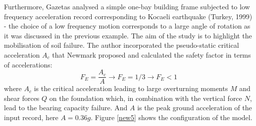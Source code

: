 \documentclass[12pt,a4paper]{report}
\begin{document}
 \newpage
  Furthermore, Gazetas analysed a simple one-bay building frame subjected to low frequency acceleration record corresponding to Kocaeli earthquake (Turkey, 1999) - the choice of a low frequency motion corresponds to a large angle of rotation as it was discussed in the previous example. The aim of the study is to highlight the mobilisation of soil failure. The author incorporated the pseudo-static critical acceleration $A_c$ that Newmark proposed and calculated the safety factor in terms of accelerations:
 \begin{equation}
 F_E= \frac{A_c}{A} \longrightarrow F_E=1/3 \longrightarrow F_E<1
 \end{equation}
 where $A_c$ is the critical acceleration leading to large overturning moments $M$ and shear forces $Q$ on the foundation which, in combination with the vertical force $N$, lead to the bearing capacity failure. And $A$ is the peak ground acceleration of the input record, here $A=0.36g$. Figure \ref{new5} shows the configuration of the model.
 
\end{document}
